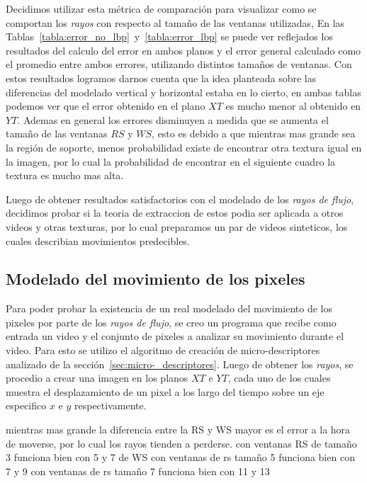 Decidimos utilizar esta métrica de comparación para visualizar como se comportan los \textit{rayos} con respecto al tamaño de las ventanas utilizadas, En las Tablas~\ref{tabla:error_no_lbp}~y~\ref{tabla:error_lbp} se puede ver reflejados los resultados del calculo del error en ambos planos y el error general calculado como el promedio entre ambos errores, utilizando distintos tamaños de ventanas. Con estos resultados logramos darnos cuenta que la idea planteada sobre las diferencias del modelado vertical y horizontal estaba en lo cierto, en ambas tablas podemos ver que el error obtenido en el plano $XT$ es mucho menor al obtenido en $YT$. Ademas en general los errores disminuyen a medida que se aumenta el tamaño de las ventanas $RS$ y $WS$, esto es debido a que mientras mas grande sea la región de soporte, menos probabilidad existe de encontrar otra textura igual en la imagen, por lo cual la probabilidad de encontrar en el siguiente cuadro la textura es mucho mas alta.


Luego de obtener resultados satisfactorios con el modelado de los \textit{rayos de flujo}, decidimos probar si la teoria de extraccion de estos podia ser aplicada a otros videos y otras texturas, por lo cual preparamos un par de videos sinteticos, los cuales describian movimientos predecibles.


\subsection{Modelado del movimiento de los pixeles}
\label{exp:rayos}
Para poder probar la existencia de un real modelado del movimiento de los pixeles por parte de los \textit{rayos de flujo}, se creo un programa que recibe como entrada un video y el conjunto de pixeles a analizar su movimiento durante el video. Para esto se utilizo el algoritmo de creación de micro-descriptores analizado de la sección~\ref{sec:micro-_descriptores}. Luego de obtener los \textit{rayos}, se procedio a crear una imagen en los planos $XT$ e $YT$, cada uno de los cuales muestra el desplazamiento de un pixel a los largo del tiempo sobre un eje especifico $x$ e $y$ respectivamente.  

mientras mas grande la diferencia entre la RS y WS mayor es el error a la hora de moverse, por lo cual los rayos tienden a perderse.
con ventanas RS de tamaño 3 funciona bien con 5 y 7 de WS
con ventanas de rs tamaño 5 funciona bien con 7 y 9
con ventanas de rs tamaño 7 funciona bien con 11 y 13

